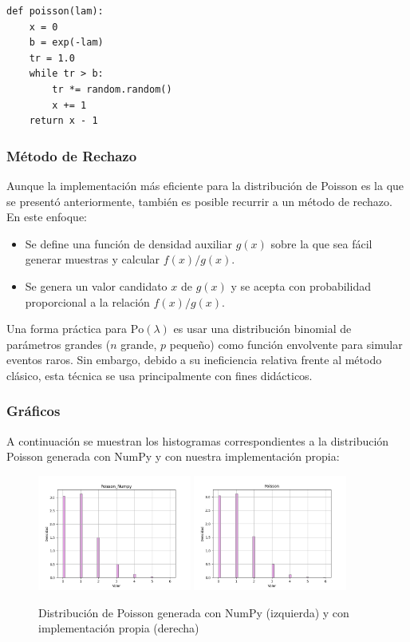 \documentclass{article}
\begin{document}
\begin{verbatim}
def poisson(lam):
    x = 0
    b = exp(-lam)
    tr = 1.0
    while tr > b:
        tr *= random.random()
        x += 1
    return x - 1
\end{verbatim}

\subsubsection{Método de Rechazo}
Aunque la implementación más eficiente para la distribución de Poisson es la que se presentó anteriormente, también es posible recurrir a un método de rechazo. En este enfoque:

\begin{itemize}
    \item Se define una función de densidad auxiliar $g(x)$ sobre la que sea fácil generar muestras y calcular $f(x)/g(x)$.
    \item Se genera un valor candidato $x$ de $g(x)$ y se acepta con probabilidad proporcional a la relación $f(x)/g(x)$.
\end{itemize}

Una forma práctica para $\mathrm{Po}(\lambda)$ es usar una distribución binomial de parámetros grandes ($n$ grande, $p$ pequeño) como función envolvente para simular eventos raros. Sin embargo, debido a su ineficiencia relativa frente al método clásico, esta técnica se usa principalmente con fines didácticos.


\subsubsection{Gráficos}
A continuación se muestran los histogramas correspondientes a la distribución Poisson generada con NumPy y con nuestra implementación propia:

\begin{figure}[H]
    \centering
    \includegraphics[width=0.45\textwidth]{Imagenes/Distribucion_Poisson_Numpy.png}
    \includegraphics[width=0.45\textwidth]{Imagenes/Distribucion_Poisson.png}
    \caption{Distribución de Poisson generada con NumPy (izquierda) y con implementación propia (derecha)}
    \label{fig:poisson}
\end{figure}
\end{document}
